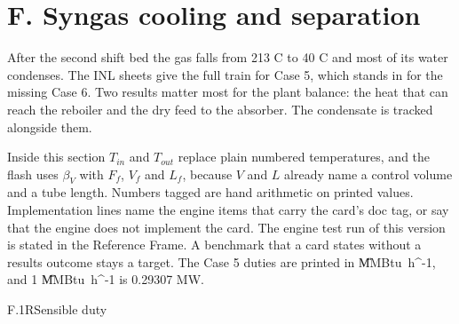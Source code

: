 \section{F. Syngas cooling and separation}\label{sec:F}
After the second shift bed the gas falls from 213 C to 40 C and most of its water condenses. The INL sheets give the full train for Case 5, which stands in for the missing Case 6. Two results matter most for the plant balance: the heat that can reach the reboiler and the dry feed to the absorber. The condensate is tracked alongside them.

Inside this section $T_{in}$ and $T_{out}$ replace plain numbered temperatures, and the flash uses $\beta_V$ with $F_f$, $V_f$ and $L_f$, because $V$ and $L$ already name a control volume and a tube length. Numbers tagged \tagC{} are hand arithmetic on printed values. Implementation lines name the engine items that carry the card's doc tag, or say that the engine does not implement the card. The engine test run of this version is stated in the Reference Frame. A benchmark that a card states without a results outcome stays a target. The Case 5 duties are printed in \U{MMBtu\ h^{-1}}, and 1 \U{MMBtu\ h^{-1}} is 0.29307 MW.

\begin{eqcard}{F.1}{R}{Sensible duty}
\end{eqcard}

